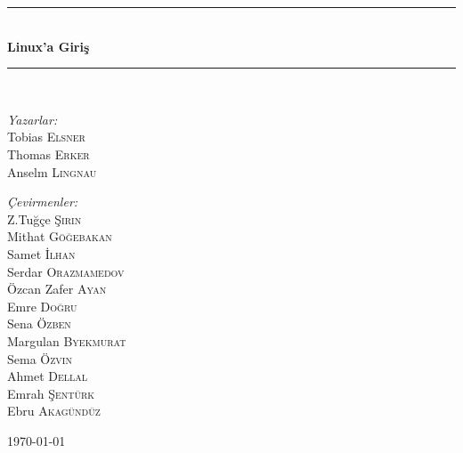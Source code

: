 \documentclass[10pt,a5paper]{book}
\newcommand{\HRule}{\rule{\linewidth}{0.5mm}}
\begin{document}
\begin{titlepage}

\begin{center}

\HRule \\[1.5cm]
{ \huge \bfseries Linux'a Giriş}\\[1.5cm]

\HRule \\[1.5cm]

\begin{minipage}{0.4\textwidth}
\begin{flushleft} \large
\emph{Yazarlar:}\\
Tobias \textsc{Elsner}\\
Thomas \textsc{Erker}\\
Anselm \textsc{Lingnau}
\end{flushleft}
\end{minipage}
\begin{minipage}{0.4\textwidth}
\begin{flushright} \large
\emph{Çevirmenler:} \\
Z.Tuğçe \textsc{Şirin}\\
Mithat \textsc{Göğebakan}\\
Samet \textsc{İlhan}\\
Serdar \textsc{Orazmamedov}\\
Özcan Zafer \textsc{Ayan}\\
Emre \textsc{Doğru}\\
Sena \textsc{Özben}\\
Margulan \textsc{Byekmurat}\\
Sema \textsc{Özvin}\\
Ahmet \textsc{Dellal}\\
Emrah \textsc{Şentürk}\\
Ebru \textsc{Akagündüz}
\end{flushright}
\end{minipage}
\vfill
{\large \today}

\end{center}

\end{titlepage}

\tableofcontents
\listoftables
















\end{document}
